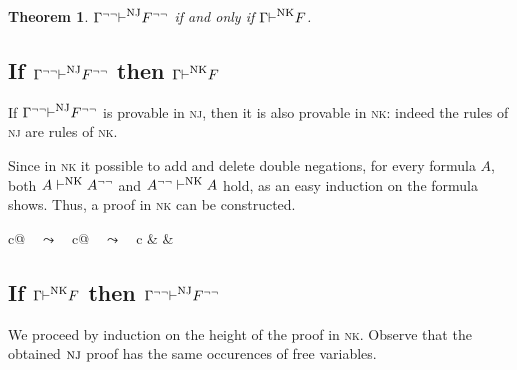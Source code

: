 \documentclass[english]{smfart}
\theoremstyle{plain}
\newtheorem{theorem}{Theorem}
\begin{document}
\begin{theorem}\label{goedel_kolmogorov} 
$\Gamma{^{\lnot\lnot}}{\vdash}^{\mbox{\textsc{nj}}} F{^{\lnot\lnot}}$ if and only if $\Gamma{\vdash}^{\mbox{\textsc{nk}}} F$. 
\end{theorem}

\subsection{If $\Gamma{^{\lnot\lnot}}{\vdash}^{\mbox{\textsc{nj}}} F{^{\lnot\lnot}}$ then $\Gamma{\vdash}^{\mbox{\textsc{nk}}} F$}

If $\Gamma{^{\lnot\lnot}}{\vdash}^{\mbox{\textsc{nj}}} F{^{\lnot\lnot}}$ is provable in {\mbox{\textsc{nj}}}, then it is also provable in 
 {\mbox{\textsc{nk}}}: indeed the rules of  {\mbox{\textsc{nj}}}{} are rules of  {\mbox{\textsc{nk}}}. 

Since  in  {\mbox{\textsc{nk}}}{} 
it possible to add and delete 
double negations, for every formula  $A$, both 
$A \vdash^{\mbox{\textsc{nk}}} A{^{\lnot\lnot}}$ and  $A{^{\lnot\lnot}}  \vdash^{\mbox{\textsc{nk}}} A$ hold, 
as an easy induction on the formula shows. 
Thus, a proof in {\mbox{\textsc{nk}}}{} can be constructed. 

\begin{center} 
\begin{tabular}{c@{$\quad\leadsto\quad$}c@{$\quad\leadsto\quad$}c}
 &
 &
 \\
\end{tabular}
\end{center} 

\subsection{If $\Gamma{\vdash}^{\mbox{\textsc{nk}}} F$ then $ \Gamma{^{\lnot\lnot}}{\vdash}^{\mbox{\textsc{nj}}} F{^{\lnot\lnot}}$}

We proceed by induction on the height of the proof in  {\mbox{\textsc{nk}}}. 
Observe that the obtained 
${\mbox{\textsc{nj}}}$ proof has the same occurences of free variables. 
\end{document}
